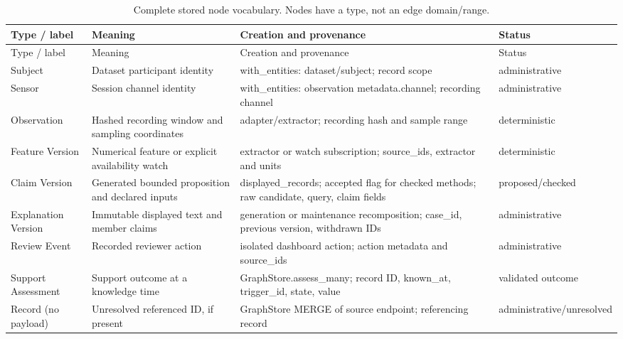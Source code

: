 \begingroup\footnotesize\setlength{\tabcolsep}{3pt}
\begin{longtable}{>{\raggedright\arraybackslash}p{}>{\raggedright\arraybackslash}p{}>{\raggedright\arraybackslash}p{}>{\raggedright\arraybackslash}p{}}
\caption{Complete stored node vocabulary. Nodes have a type, not an edge domain/range.}\label{tab:fullnodes}\\
\toprule Type / label & Meaning & Creation and provenance & Status \\\midrule\endfirsthead
\toprule Type / label & Meaning & Creation and provenance & Status \\\midrule\endhead
Subject & Dataset participant identity & with\_\allowbreak{}entities: dataset/\allowbreak{}subject; record scope & administrative \\[3pt]
Sensor & Session channel identity & with\_\allowbreak{}entities: observation metadata.\allowbreak{}channel; recording channel & administrative \\[3pt]
Observation & Hashed recording window and sampling coordinates & adapter/\allowbreak{}extractor; recording hash and sample range & deterministic \\[3pt]
Feature Version & Numerical feature or explicit availability watch & extractor or watch subscription; source\_\allowbreak{}ids, extractor and units & deterministic \\[3pt]
Claim Version & Generated bounded proposition and declared inputs & displayed\_\allowbreak{}records; accepted flag for checked methods; raw candidate, query, claim fields & proposed/\allowbreak{}checked \\[3pt]
Explanation Version & Immutable displayed text and member claims & generation or maintenance recomposition; case\_\allowbreak{}id, previous version, withdrawn IDs & administrative \\[3pt]
Review Event & Recorded reviewer action & isolated dashboard action; action metadata and source\_\allowbreak{}ids & administrative \\[3pt]
Support Assessment & Support outcome at a knowledge time & GraphStore.\allowbreak{}assess\_\allowbreak{}many; record ID, known\_\allowbreak{}at, trigger\_\allowbreak{}id, state, value & validated outcome \\[3pt]
Record (no payload) & Unresolved referenced ID, if present & GraphStore MERGE of source endpoint; referencing record & administrative/\allowbreak{}unresolved \\[3pt]
\bottomrule\end{longtable}\endgroup